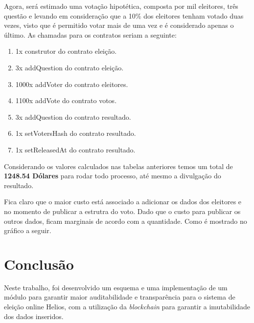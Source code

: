 \documentclass{ufsctex/ufsctex}
\begin{document}
Agora, será estimado uma votação hipotética, composta por mil eleitores, três
questão e levando em consideração que a 10\% dos eleitores tenham votado duas
vezes, visto que é permitido votar mais de uma vez e é considerado apenas o
último. As chamadas para os contratos seriam a seguinte:

\begin{enumerate}
	\item 1x construtor do contrato eleição.
	\item 3x addQuestion do contrato eleição.
	\item 1000x addVoter do contrato eleitores.
	\item 1100x addVote do contrato votos.
	\item 3x addQuestion do contrato resultado.
	\item 1x setVotersHash do contrato resultado.
	\item 1x setReleasedAt do contrato resultado.
\end{enumerate}

Considerando os valores calculados nas tabelas anteriores temos um total de
\textbf{1248.54 Dólares} para rodar todo processo, até mesmo a divulgação do
resultado.

Fica claro que o maior custo está associado a adicionar os dados dos eleitores
e no momento de publicar a estrutra do voto. Dado que o custo para publicar os
outros dados, ficam marginais de acordo com a quantidade. Como é mostrado no
gráfico a seguir.


\chapter{Conclusão}
Neste trabalho, foi desenvolvido um esquema e uma implementação de um módulo
para garantir maior auditabilidade e transparência para o sistema de eleição
online Helios, com a utilização da \textit{blockchain} para garantir a
imutabilidade dos dados inseridos. 
\end{document}
